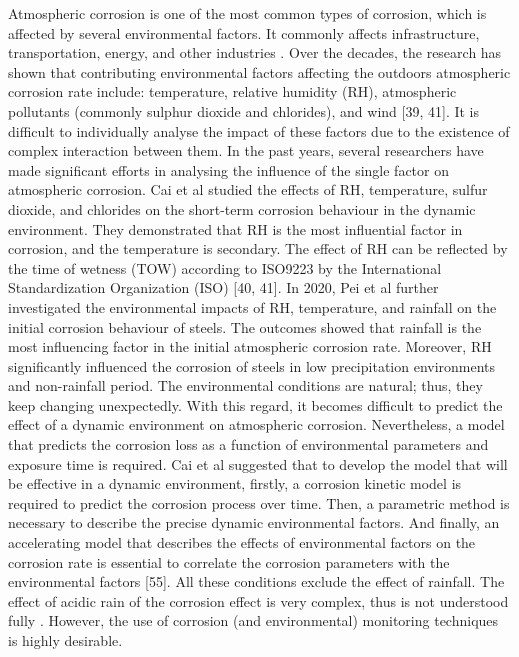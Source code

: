 \documentclass[12pt]{report}
\begin{document}
Atmospheric corrosion is one of the most common types of corrosion, which is affected by several environmental factors. It commonly affects infrastructure, transportation, energy, and other industries \cite{pei2021understanding}. Over the decades, the research has shown that contributing environmental factors affecting the outdoors atmospheric corrosion rate include: temperature, relative humidity (RH), atmospheric pollutants (commonly sulphur dioxide and chlorides), and wind [39, 41]. It is difficult to individually analyse the impact of these factors due to the existence of complex interaction between them.
In the past years, several researchers have made significant efforts in analysing the influence of the single factor on atmospheric corrosion. Cai et al \cite{cai2018influence} studied the effects of RH, temperature, sulfur dioxide, and chlorides on the short-term corrosion behaviour in the dynamic environment. They demonstrated that RH is the most influential factor in corrosion, and the temperature is secondary. The effect of RH can be reflected by the time of wetness (TOW) according to ISO9223 by the International Standardization Organization (ISO) [40, 41]. In 2020, Pei et al \cite{pei2021understanding} further investigated the environmental impacts of RH, temperature, and rainfall on the initial corrosion behaviour of steels. The outcomes showed that rainfall is the most influencing factor in the initial atmospheric corrosion rate.  Moreover, RH significantly influenced the corrosion of steels in low precipitation environments and non-rainfall period.
The environmental conditions are natural; thus, they keep changing unexpectedly. With this regard, it becomes difficult to predict the effect of a dynamic environment on atmospheric corrosion. Nevertheless, a model that predicts the corrosion loss as a function of environmental parameters and exposure time is required. Cai et al \cite{cai2018influence} suggested that to develop the model that will be effective in a dynamic environment, firstly, a corrosion kinetic model is required to predict the corrosion process over time. Then, a parametric method is necessary to describe the precise dynamic environmental factors. And finally, an accelerating model that describes the effects of environmental factors on the corrosion rate is essential to correlate the corrosion parameters with the environmental factors [55]. All these conditions exclude the effect of rainfall. The effect of acidic rain of the corrosion effect is very complex, thus is not understood fully \cite{pei2021understanding}. However, the use of corrosion (and environmental) monitoring techniques is highly desirable.
\end{document}
